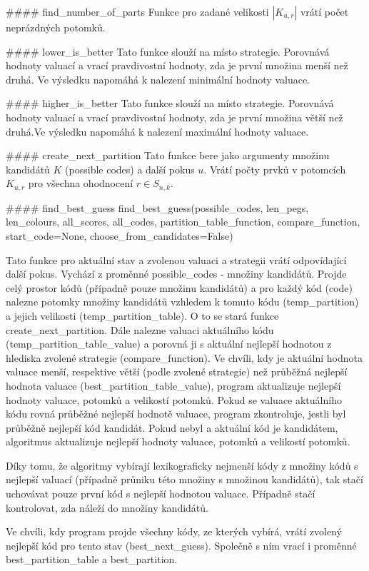 \documentclass[12pt,a4paper]{article}
\begin{document}
#### find_number_of_parts
Funkce pro zadané velikosti $|K_{u,r}|$ vrátí počet neprázdných potomků.

#### lower_is_better
Tato funkce slouží na místo strategie. Porovnává hodnoty valuací a vrací pravdivostní hodnoty, zda je první množina menší než druhá. Ve výsledku napomáhá k nalezení minimální hodnoty valuace.

#### higher_is_better
Tato funkce slouží na místo strategie. Porovnává hodnoty valuací a vrací pravdivostní hodnoty, zda je první množina větší než druhá.Ve výsledku napomáhá k nalezení maximální hodnoty valuace.

#### create_next_partition
Tato funkce bere jako argumenty množinu kandidátů $K$ (possible codes) a další pokus $u$. Vrátí počty prvků v potomcích $K_{u,r}$ pro všechna ohodnocení $r \in S_{n,k}$.

#### find_best_guess
find_best_guess(possible_codes, len_pegs, len_colours, all_scores, all_codes, partition_table_function, compare_function, start_code=None, choose_from_candidates=False)

Tato funkce pro aktuální stav a zvolenou valuaci a strategii vrátí odpovídající další pokus. Vychází z proměnné possible_codes - množiny kandidátů. Projde celý prostor kódů (případně pouze množinu kandidátů) a pro každý kód (code) nalezne potomky množiny kandidátů vzhledem k tomuto kódu (temp_partition) a jejich velikosti (temp_partition_table). O to se stará funkce create_next_partition. Dále nalezne valuaci aktuálního kódu (temp_partition_table_value) a porovná ji s aktuální nejlepší hodnotou z hlediska zvolené strategie (compare_function). Ve chvíli, kdy je aktuální hodnota valuace menší, respektive větší (podle zvolené strategie) než průběžná nejlepší hodnota valuace (best_partition_table_value), program aktualizuje nejlepší hodnoty valuace, potomků a velikostí potomků. Pokud se valuace aktuálního kódu rovná průběžné nejlepší hodnotě valuace, program zkontroluje, jestli byl průběžně nejlepší kód kandidát. Pokud nebyl a aktuální kód je kandidátem, algoritmus aktualizuje nejlepší hodnoty valuace, potomků a velikostí potomků. 

Díky tomu, že algoritmy vybírají lexikograficky nejmenší kódy z množiny kódů s nejlepší valuací (případně průniku této množiny s množinou kandidátů), tak stačí uchovávat pouze první kód s nejlepší hodnotou valuace. Případně stačí kontrolovat, zda náleží do množiny kandidátů.

Ve chvíli, kdy program projde všechny kódy, ze kterých vybírá, vrátí zvolený nejlepší kód pro tento stav (best_next_guess). Společně s ním vrací i proměnné best_partition_table a best_partition. 
\end{document}
